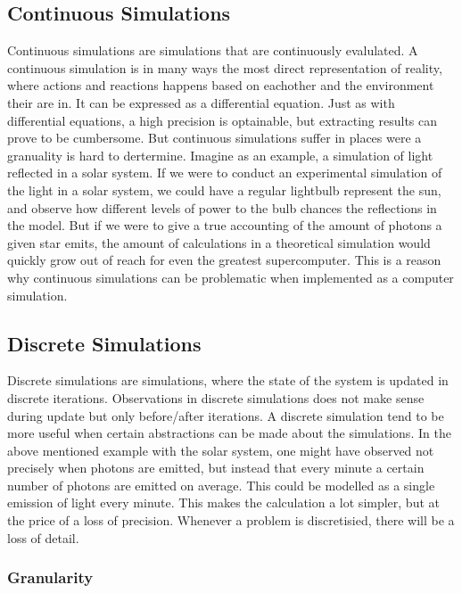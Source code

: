 \subsection{Continuous Simulations}
Continuous simulations are simulations that are continuously evalulated. A continuous simulation is in many ways the most direct representation of reality, where actions and reactions happens based on eachother and the environment their are in. It can be expressed as a differential equation. Just as with differential equations, a high precision is optainable, but extracting results can prove to be cumbersome. But continuous simulations suffer in places were a granuality is hard to dertermine. Imagine as an example, a simulation of light reflected in a solar system. If we were to conduct an experimental simulation of the light in a solar system, we could have a regular lightbulb represent the sun, and observe how different levels of power to the bulb chances the reflections in the model. But if we were to give a true accounting of the amount of photons a given star emits, the amount of calculations in a theoretical simulation would quickly grow out of reach for even the greatest supercomputer. This is a reason why continuous simulations can be problematic when implemented as a computer simulation.
\label{simulationchoise}


\subsection{Discrete Simulations}
Discrete simulations are simulations, where the state of the system is updated in discrete iterations. Observations in discrete simulations does not make sense during update but only before/after iterations. A discrete simulation tend to be more useful when certain abstractions can be made about the simulations. In the above mentioned example with the solar system, one might have observed not precisely when photons are emitted, but instead that every minute a certain number of photons are emitted on average. This could be modelled as a single emission of light every minute. This makes the calculation a lot simpler, but at the price of a loss of precision. Whenever a problem is discretisied, there will be a loss of detail.




\subsubsection{Granularity}

